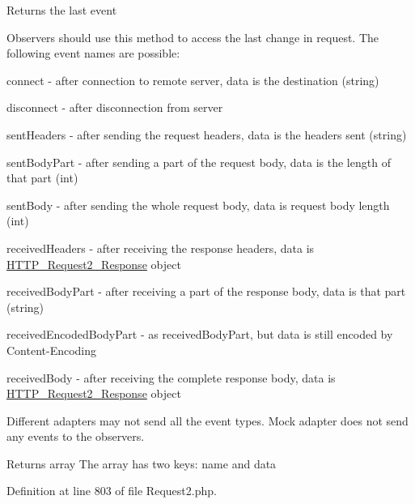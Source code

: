 Returns the last event

Observers should use this method to access the last change in request. The following event names are possible\+: 
\begin{DoxyItemize}
\item \textquotesingle{}connect\textquotesingle{} -\/ after connection to remote server, data is the destination (string) 
\item \textquotesingle{}disconnect\textquotesingle{} -\/ after disconnection from server 
\item \textquotesingle{}sent\+Headers\textquotesingle{} -\/ after sending the request headers, data is the headers sent (string) 
\item \textquotesingle{}sent\+Body\+Part\textquotesingle{} -\/ after sending a part of the request body, data is the length of that part (int) 
\item \textquotesingle{}sent\+Body\textquotesingle{} -\/ after sending the whole request body, data is request body length (int) 
\item \textquotesingle{}received\+Headers\textquotesingle{} -\/ after receiving the response headers, data is \hyperlink{classHTTP__Request2__Response}{H\+T\+T\+P\+\_\+\+Request2\+\_\+\+Response} object 
\item \textquotesingle{}received\+Body\+Part\textquotesingle{} -\/ after receiving a part of the response body, data is that part (string) 
\item \textquotesingle{}received\+Encoded\+Body\+Part\textquotesingle{} -\/ as \textquotesingle{}received\+Body\+Part\textquotesingle{}, but data is still encoded by Content-\/\+Encoding 
\item \textquotesingle{}received\+Body\textquotesingle{} -\/ after receiving the complete response body, data is \hyperlink{classHTTP__Request2__Response}{H\+T\+T\+P\+\_\+\+Request2\+\_\+\+Response} object 
\end{DoxyItemize}Different adapters may not send all the event types. Mock adapter does not send any events to the observers.

\begin{DoxyReturn}{Returns}
array The array has two keys\+: \textquotesingle{}name\textquotesingle{} and \textquotesingle{}data\textquotesingle{} 
\end{DoxyReturn}


Definition at line 803 of file Request2.\+php.

\hypertarget{classHTTP__Request2_a1a362b64dbeeb0321b55df04c6f2c820}{}\label{classHTTP__Request2_a1a362b64dbeeb0321b55df04c6f2c820} 

